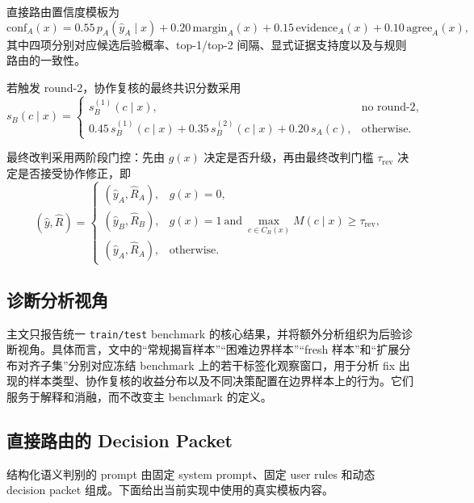 \documentclass[11pt,a4paper]{ctexart}
\begin{document}
直接路由置信度模板为
\begin{equation}
\label{eq:appendix-semantic-confidence}
\mathrm{conf}_A(x)=
0.55\,p_A(\hat y_A\mid x)
+0.20\,\mathrm{margin}_A(x)
+0.15\,\mathrm{evidence}_A(x)
+0.10\,\mathrm{agree}_A(x),
\end{equation}
其中四项分别对应候选后验概率、top-1/top-2 间隔、显式证据支持度以及与规则路由的一致性。

若触发 round-2，协作复核的最终共识分数采用
\begin{equation}
\label{eq:appendix-final-consensus}
s_B(c\mid x)=
\begin{cases}
s_B^{(1)}(c\mid x), & \text{no round-2},\\
0.45\,s_B^{(1)}(c\mid x)+0.35\,s_B^{(2)}(c\mid x)+0.20\,s_A(c), & \text{otherwise}.
\end{cases}
\end{equation}

最终改判采用两阶段门控：先由 $g(x)$ 决定是否升级，再由最终改判门槛 $\tau_{\mathrm{rev}}$ 决定是否接受协作修正，即
\begin{equation}
\label{eq:appendix-final-decision}
(\hat y,\hat R)=
\begin{cases}
(\hat y_A,\hat R_A), & g(x)=0,\\
(\hat y_B,\hat R_B), & g(x)=1\ \text{and}\ \max_{c\in C_R(x)} M(c\mid x)\ge \tau_{\mathrm{rev}},\\
(\hat y_A,\hat R_A), & \text{otherwise}.
\end{cases}
\end{equation}

\subsection{诊断分析视角}

主文只报告统一 \texttt{train/test} benchmark 的核心结果，并将额外分析组织为后验诊断视角。具体而言，文中的“常规揭盲样本”“困难边界样本”“fresh 样本”和“扩展分布对齐子集”分别对应冻结 benchmark 上的若干标签化观察窗口，用于分析 fix 出现的样本类型、协作复核的收益分布以及不同决策配置在边界样本上的行为。它们服务于解释和消融，而不改变主 benchmark 的定义。

\subsection{直接路由的 Decision Packet}

结构化语义判别的 prompt 由固定 system prompt、固定 user rules 和动态 decision packet 组成。下面给出当前实现中使用的真实模板内容。
\end{document}
